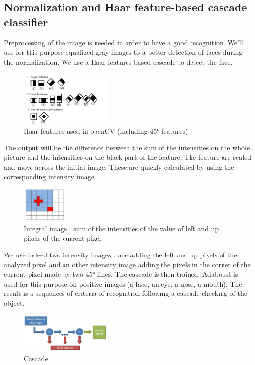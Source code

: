 \subsection{Normalization and Haar feature-based cascade classifier}
Preprocessing of the image is needed in order to have a good recognition. We'll use for this purpose equalized gray images to a better detection of faces during the normalization. We use a Haar features-based cascade to detect the face.
\begin{figure}[ht]
	\centering		
	\includegraphics[width = 0.4\textwidth]{rsrc/Haarfeatures.png}
	\caption{Haar features used in openCV (including 45° features)}
	\label{fig:Haar features}
\end{figure}
The output will be the difference between the sum of the intensities on the whole picture and the intensities on the black part of the feature. The feature are scaled and move across the initial image. These are quickly calculated by using the corresponding intensity image.
\begin{figure}[ht]
	\centering		
	\includegraphics[width = 0.2\textwidth]{rsrc/IntegralImage.jpg}
	\caption{Integral image : sum of the intensities of the value of left and up pixels of the current pixel}
	\label{fig:Integral image}
\end{figure}
We use indeed two intensity images : one adding the left and up pixels of the analyzed pixel and an other intensity image adding the pixels in the corner of the current pixel made by two 45° lines.
The cascade is then trained. Adaboost is used for this purpose on positive images (a face, an eye, a nose, a mouth). The result is a sequences of criteria of recognition following a cascade checking of the object.
\begin{figure}[ht]
	\centering		
	\includegraphics[width = 0.4\textwidth]{rsrc/Cascade.jpg}
	\caption{Cascade}
	\label{fig:Cascade}
\end{figure}
